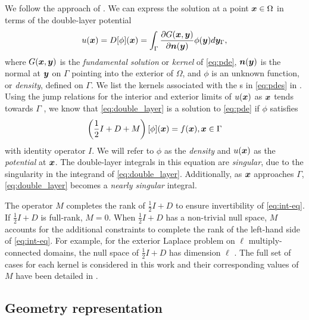 We follow the approach of \cite{YBZ}. 
We can express  the solution at a point ${\bm{x}} \in \Omega$ in terms of the double-layer potential
\begin{equation}
  u({\bm{x}}) = D[\phi]({\bm{x}}) = \int_\Gamma \frac{\partial G({\bm{x}},{\bm{y}})}{\partial {\bm{n}}({\bm{y}})} \phi({\bm{y}}) d{\bm{y}}_\Gamma,
  \label{eq:double_layer}
\end{equation}
where $G({\bm{x}},{\bm{y}})$ is the \textit{fundamental solution} or \textit{kernel} of \cref{eq:pde}, ${\bm{n}}({\bm{y}})$ is the normal at ${\bm{y}}$ on $\Gamma$ pointing into the exterior of $\Omega$, and $\phi$ is an unknown function, or \textit{density}, defined on $\Gamma$.
We list the kernels associated with the s\xspace in \cref{eq:pdes} in \cite[Section 1]{morse2020bsupplementary}.
Using the jump relations for the interior and exterior limits of $u({\bm{x}})$ as ${\bm{x}}$ tends towards $\Gamma$ \cite{K,mikhlin2014integral,pozrikidis1992boundary,parton1982integral}, we know that \cref{eq:double_layer} is a solution to \cref{eq:pde} if $\phi$ satisfies 
\begin{equation}
  \left(\frac{1}{2}I + D + M\right)[\phi]({\bm{x}}) = f({\bm{x}}), {\bm{x}} \in \Gamma
  \label{eq:int-eq}
\end{equation}
with identity operator $I$. 
We will refer to $\phi$ as the \textit{density} and $u({\bm{x}})$ as the \textit{potential} at ${\bm{x}}$.
The double-layer integrals in this equation are \textit{singular}, due to the singularity in the integrand of \cref{eq:double_layer}. 
Additionally, as ${\bm{x}}$ approaches $\Gamma$, \cref{eq:double_layer} becomes a \textit{nearly singular} integral.

The operator $M$ completes the rank of $\frac{1}{2}I + D$ to ensure invertibility of \cref{eq:int-eq}. 
If $\frac{1}{2}I + D$ is full-rank, $M = 0$.
When $\frac{1}{2}I + D$ has a non-trivial null space, $M$ accounts for the additional constraints to complete the rank of the left-hand side of \cref{eq:int-eq}.
For example, for the exterior Laplace problem on $\ell$ multiply-connected domains, the null space of $\frac{1}{2}I + D$ has dimension $\ell$ \cite{ST}.
The full set of cases for each kernel is considered in this work and their corresponding values of $M$ have been detailed in \cite{YBZ}. 



\subsection{Geometry representation \label{sec:geom-def}}

